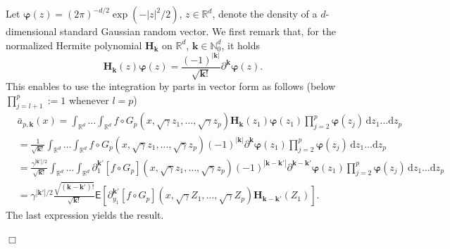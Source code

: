 \documentclass[bj]{imsart}
\def\rmd{\mathrm{d}}
\newcommand{\proofendsign}{$\Box$}
\newenvironment{proof}{{\noindent \bf Proof }}
 {{\hspace*{\fill}\proofendsign\par\bigskip}}
\begin{document}
\begin{proof}
Let $\boldsymbol{\varphi}(z)=(2\pi)^{-d/2} \exp(-|z|^2/2)$,
$z\in\mathbb R^d$, denote the density of a $d$-dimensional
standard Gaussian random vector.
We first remark that, for the normalized Hermite polynomial $\mathbf H_{\mathbf k}$ on $\mathbb R^d$,
$\mathbf k\in\mathbb N_0^d$, it holds
$$
\mathbf{H}_{\mathbf{k}}(z)\boldsymbol{\varphi}(z)
=\frac{(-1)^{|\mathbf{k}|}}{\sqrt{\mathbf{k} !}} \partial^{\mathbf{k}} \boldsymbol{\varphi}(z).
$$
This enables to use the integration by parts in vector form as follows
(below $\prod_{j=l+1}^p:=1$ whenever $l=p$)
\begin{align*}
&\bar a_{p,\mathbf{k}}(x)
 =
\int_{\mathbb R^d}\ldots\int_{\mathbb R^d}
f\circ G_{p}(x,\sqrt{\gamma}z_{1},\ldots,\sqrt{\gamma}z_{p})
\mathbf{H}_{\mathbf{k}}(z_{1})\boldsymbol{\varphi}(z_1)
\prod_{j=2}^p\boldsymbol{\varphi}(z_j)\, \rmd z_{1}\ldots \rmd z_{p}
\\
& =
\frac{1}{\sqrt{\mathbf k!}}
\int_{\mathbb R^d}\ldots\int_{\mathbb R^d}
f\circ G_{p}(x,\sqrt{\gamma}z_{1},\ldots,\sqrt{\gamma}z_{p})
(-1)^{|\mathbf{k}|}\partial^{\mathbf{k}} \boldsymbol{\varphi}(z_1)
\prod_{j=2}^p\boldsymbol{\varphi}(z_j)\, \rmd z_{1}\ldots  \rmd z_{p}
\\
& =
\frac{\gamma^{|\mathbf k'|/2}}{\sqrt{\mathbf k!}}
\int_{\mathbb R^d}\ldots\int_{\mathbb R^d}
\partial_{1}^{\mathbf k'}[f\circ G_{p}](x,\sqrt{\gamma}z_{1},\ldots,\sqrt{\gamma}z_{p})
(-1)^{|\mathbf{k}-\mathbf k'|}\partial^{\mathbf{k}-\mathbf k'} \boldsymbol{\varphi}(z_1)
\prod_{j=2}^p\boldsymbol{\varphi}(z_j)\, \rmd z_{1}\ldots \rmd z_{p}
\\
 & =\gamma^{|\mathbf{k}'|/2}\frac{\sqrt{(\mathbf{k}-\mathbf{k}')!}}{\sqrt{\mathbf{k}!}}\mathsf{E}\left[\partial_{y_{1}}^{\mathbf{k}'}[f\circ G_{p}](x,\sqrt{\gamma}Z_{1},\ldots,\sqrt{\gamma}Z_{p})\mathbf{H}_{\mathbf{k}-\mathbf{k}'}(Z_{1})\right].
\end{align*}
The last expression yields the result.
\end{proof}
\end{document}
